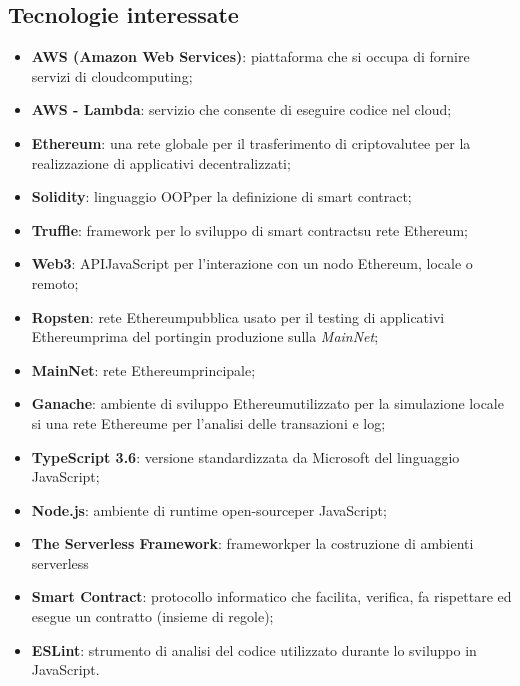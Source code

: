 \subsection{Tecnologie interessate}
\begin{itemize}
	\item \textbf{AWS (Amazon Web Services)}: piattaforma che si occupa di fornire servizi di cloud\glo computing\glos;
	\item \textbf{AWS - Lambda}: servizio che consente di eseguire codice nel cloud\glos;
	\item \textbf{Ethereum\glos}: una rete globale per il trasferimento di criptovalute\glo e per la realizzazione di applicativi decentralizzati;
	\item \textbf{Solidity}: linguaggio OOP\glo per la definizione di smart contract\glos;
	\item \textbf{Truffle}: framework per lo sviluppo di smart contract\glo su rete Ethereum\glos;
	\item \textbf{Web3}: API\glo JavaScript per l'interazione con un nodo Ethereum\glos, locale o remoto;
	\item \textbf{Ropsten}: rete Ethereum\glo pubblica usato per il testing di applicativi Ethereum\glo prima del porting\glo in produzione sulla \textit{MainNet};
	\item \textbf{MainNet}: rete Ethereum\glo principale;
	\item \textbf{Ganache}: ambiente di sviluppo Ethereum\glo utilizzato per la simulazione locale si una rete Ethereum\glo e per l'analisi delle transazioni e log;
	\item \textbf{TypeScript 3.6}: versione standardizzata da Microsoft del linguaggio JavaScript;
	\item \textbf{Node.js}: ambiente di runtime open-source\glo per JavaScript;
	\item \textbf{The Serverless Framework}: framework\glo per la costruzione di ambienti serverless\glo
	\item \textbf{Smart Contract\glos}: protocollo informatico che facilita, verifica, fa rispettare ed esegue un contratto (insieme di regole);
	\item \textbf{ESLint}: strumento di analisi del codice utilizzato durante lo sviluppo in JavaScript.
\end{itemize}

